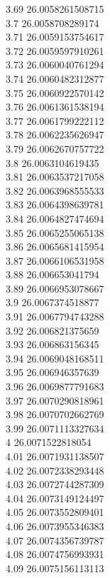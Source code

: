 {3.69	26.0058261508715\\
3.7	26.0058708289174\\
3.71	26.0059153754617\\
3.72	26.0059597910261\\
3.73	26.0060040761294\\
3.74	26.0060482312877\\
3.75	26.0060922570142\\
3.76	26.0061361538194\\
3.77	26.0061799222112\\
3.78	26.0062235626947\\
3.79	26.0062670757722\\
3.8	26.0063104619435\\
3.81	26.0063537217058\\
3.82	26.0063968555533\\
3.83	26.0064398639781\\
3.84	26.0064827474694\\
3.85	26.0065255065138\\
3.86	26.0065681415954\\
3.87	26.0066106531958\\
3.88	26.006653041794\\
3.89	26.0066953078667\\
3.9	26.0067374518877\\
3.91	26.0067794743288\\
3.92	26.006821375659\\
3.93	26.006863156345\\
3.94	26.0069048168511\\
3.95	26.006946357639\\
3.96	26.0069877791683\\
3.97	26.0070290818961\\
3.98	26.0070702662769\\
3.99	26.0071113327634\\
4	26.0071522818054\\
4.01	26.0071931138507\\
4.02	26.0072338293448\\
4.03	26.0072744287309\\
4.04	26.0073149124497\\
4.05	26.0073552809401\\
4.06	26.0073955346383\\
4.07	26.0074356739787\\
4.08	26.0074756993931\\
4.09	26.0075156113113\\
}
